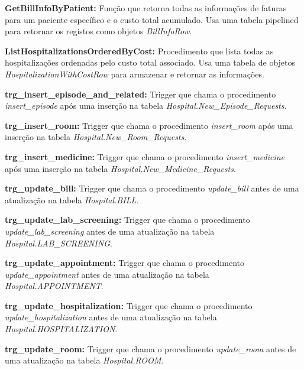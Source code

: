 \vspace{0.15cm}
\textbf{GetBillInfoByPatient:} Função que retorna todas as informações de faturas para um paciente específico e o custo total acumulado. Usa uma tabela pipelined para retornar os registos como objetos \textit{BillInfoRow}.

\vspace{0.15cm}
\textbf{ListHospitalizationsOrderedByCost:} Procedimento que lista todas as hospitalizações ordenadas pelo custo total associado. Usa uma tabela de objetos \textit{HospitalizationWithCostRow} para armazenar e retornar as informações.

\vspace{0.15cm}
\textbf{trg\_insert\_episode\_and\_related:} Trigger que chama o procedimento \textit{insert\_episode} após uma inserção na tabela \textit{Hospital.New\_Episode\_Requests}.

\vspace{0.15cm}
\textbf{trg\_insert\_room:} Trigger que chama o procedimento \textit{insert\_room} após uma inserção na tabela \textit{Hospital.New\_Room\_Requests}.

\vspace{0.15cm}
\textbf{trg\_insert\_medicine:} Trigger que chama o procedimento \textit{insert\_medicine} após uma inserção na tabela \textit{Hospital.New\_Medicine\_Requests}.

\vspace{0.15cm}
\textbf{trg\_update\_bill:} Trigger que chama o procedimento \textit{update\_bill} antes de uma atualização na tabela \textit{Hospital.BILL}.

\vspace{0.15cm}
\textbf{trg\_update\_lab\_screening:} Trigger que chama o procedimento \textit{update\_lab\_screening} antes de uma atualização na tabela \textit{Hospital.LAB\_SCREENING}.

\vspace{0.15cm}
\textbf{trg\_update\_appointment:} Trigger que chama o procedimento \textit{update\_appointment} antes de uma atualização na tabela \textit{Hospital.APPOINTMENT}.

\vspace{0.15cm}
\textbf{trg\_update\_hospitalization:} Trigger que chama o procedimento \textit{update\_hospitalization} antes de uma atualização na tabela \textit{Hospital.HOSPITALIZATION}.

\vspace{0.15cm}
\textbf{trg\_update\_room:} Trigger que chama o procedimento \textit{update\_room} antes de uma atualização na tabela \textit{Hospital.ROOM}.

